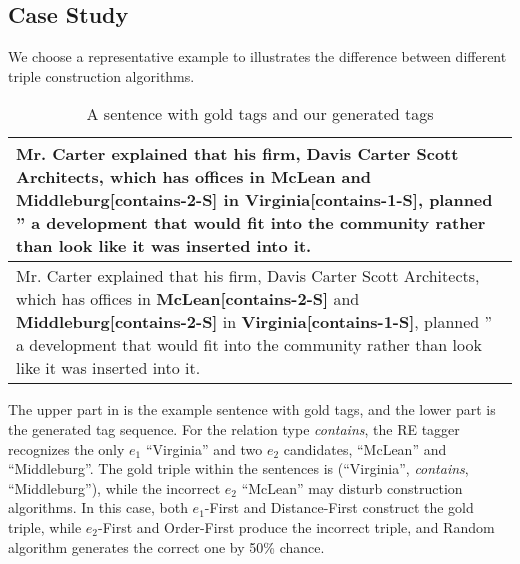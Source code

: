 


\subsection{Case Study}
We choose a representative example to illustrates the difference between
different triple construction algorithms.

\begin{table}[ht]
  \small
  \caption{A sentence with gold tags and our generated tags}
  \label{tab:case}
  \begin{center}
    \begin{tabular}{p{7cm}}
      \hline
      Mr. Carter explained that his firm, Davis Carter Scott Architects, which has offices in McLean and \textbf{Middleburg[contains-2-S]} in \textbf{Virginia[contains-1-S]}, planned '' a development that would fit into the community rather than look like it was inserted into it.  \\
      \hline
      Mr. Carter explained that his firm, Davis Carter Scott Architects, which has offices in \textbf{McLean[contains-2-S]} and \textbf{Middleburg[contains-2-S]} in \textbf{Virginia[contains-1-S]}, planned '' a development that would fit into the community rather than look like it was inserted into it. \\
      \hline
    \end{tabular}
  \end{center}
\end{table}

The upper part in  is the example sentence with gold tags,
and the lower part is the generated tag sequence.
For the relation type \textit{contains}, the RE tagger recognizes the only $e_1$ ``Virginia''
and two $e_2$ candidates, ``McLean'' and ``Middleburg''.
The gold triple within the sentences is (``Virginia'', \textit{contains}, ``Middleburg''),
while the incorrect $e_2$ ``McLean'' may disturb construction algorithms.
In this case, both $e_1$-First and Distance-First construct the gold triple,
while $e_2$-First and Order-First produce the incorrect triple,
and Random algorithm generates the correct one by 50\% chance.

